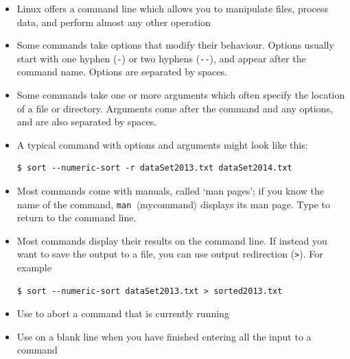 \documentclass[a4paper,twoside,titlepage]{memoir}
\newcommand{\shellcmd}{\texttt}
\newcommand{\shellvar}[1]{$\langle \text{#1}\rangle$}
\begin{document}
\begin{itemize}
\item Linux offers a command line which allows you to manipulate files, process data, and perform almost any other operation
\item Some commands take options that modify their behaviour.  Options usually start with one hyphen (\shellcmd{-}) or two hyphens (\shellcmd{-{}-}), and appear after the command name.  Options are separated by spaces.
\item Some commands take one or more arguments which often specify the location of a file or directory.  Arguments come after the command and any options, and are also separated by spaces.
\item A typical command with options and arguments might look like this:
\begin{verbatim}
$ sort --numeric-sort -r dataSet2013.txt dataSet2014.txt
\end{verbatim}
\item Most commands come with manuals, called `man pages'; if you know the name of the command, \shellcmd{man \shellvar{mycommand}} displays its man page.  Type  to return to the command line.
\index{man@\shellcmd{man}}
\item Most commands display their results on the command line.  If instead you want to save the output to a file, you can use output redirection (\shellcmd{>}).  For example
\begin{verbatim}
$ sort --numeric-sort dataSet2013.txt > sorted2013.txt
\end{verbatim}
\item Use  to abort a command that is currently running
\item Use  on a blank line when you have finished entering all the input to a command
\end{itemize}
\end{document}
